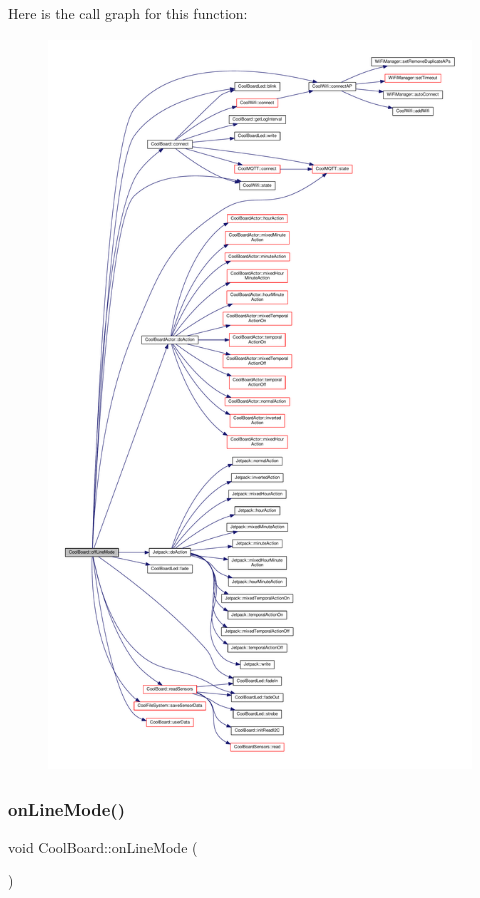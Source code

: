 Here is the call graph for this function\+:\nopagebreak
\begin{figure}[H]
\begin{center}
\leavevmode
\includegraphics[height=550pt]{d7/df9/class_cool_board_ae6b5e1274d760462290192acea4adca8_cgraph}
\end{center}
\end{figure}
\mbox{\label{class_cool_board_aa0bbc4bc605e35618d18e68795c61363}} 
\subsubsection{\texorpdfstring{on\+Line\+Mode()}{onLineMode()}}
{\footnotesize\ttfamily void Cool\+Board\+::on\+Line\+Mode (\begin{DoxyParamCaption}{ }\end{DoxyParamCaption})}

